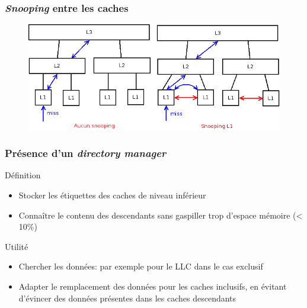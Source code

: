 \begin{frame}
  \frametitle{\emph{Snooping} entre les caches}
  
  \begin{figure}[h!]
    \includegraphics[width=.8\textwidth]{images/DiagrammeSnooping.png}
  \end{figure}  
  
\end{frame}


\begin{frame}
  \frametitle{Présence d'un \emph{directory manager}}
\begin{block}{Définition}
  \begin{itemize}
  \item Stocker les étiquettes des caches de niveau inférieur
  \item Connaître le contenu des descendants sans gaspiller trop d'espace mémoire (< 10\%)
  \end{itemize}
\end{block}

\begin{block}{Utilité}
\begin{itemize}
\item Chercher les données: par exemple pour le LLC dans le cas exclusif
\item Adapter le remplacement des données pour les caches inclusifs, en évitant d'évincer des données présentes dans les caches descendants
\end{itemize}
\end{block}  
\end{frame}
